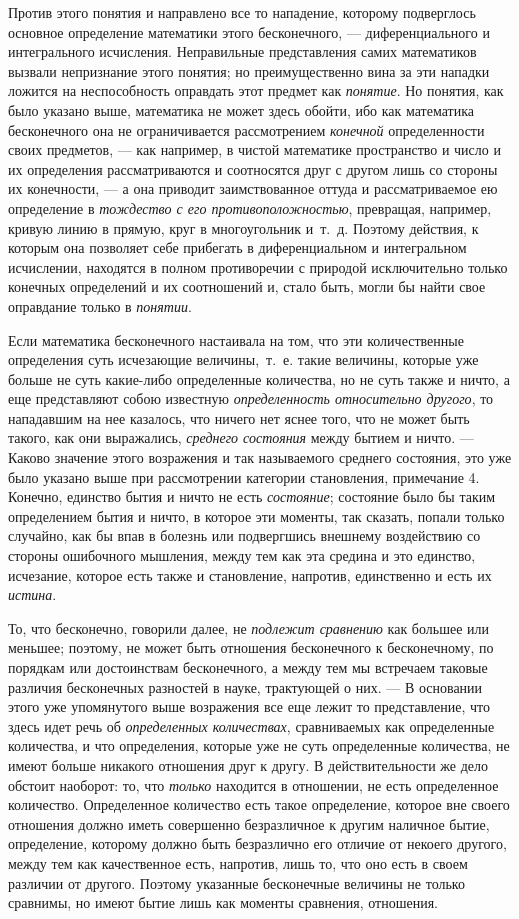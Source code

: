 {Против этого понятия и направлено все то нападение, которому подверглось
основное определение математики этого бесконечного, — диференциального и
интегрального исчисления. Неправильные представления самих математиков
вызвали непризнание этого понятия; но преимущественно вина за эти нападки
ложится на неспособность оправдать этот предмет как
{\em понятие}. Но понятия, как было указано выше,
математика не может здесь обойти, ибо как математика бесконечного она не
ограничивается рассмотрением {\em конечной}
определенности своих предметов, — как например, в чистой математике
пространство и число и их определения рассматриваются и соотносятся друг с
другом лишь со стороны их конечности, — а она приводит заимствованное
оттуда и рассматриваемое ею определение в
{\em тождество с его противоположностью}, превращая,
например, кривую линию в прямую, круг в многоугольник и~т.~д. Поэтому
действия, к которым она позволяет себе прибегать в диференциальном и
интегральном исчислении, находятся в полном противоречии с природой
исключительно только конечных определений и их соотношений и, стало быть,
могли бы найти свое оправдание только в {\em понятии}.

Если математика бесконечного настаивала на том, что эти количественные
определения суть исчезающие величины,~т.~е. такие величины, которые уже
больше не суть какие-либо определенные количества, но не суть также и
ничто, а еще представляют собою известную
{\em определенность относительно другого}, то
нападавшим на нее казалось, что ничего нет яснее того, что не может быть
такого, как они выражались, {\em среднего состояния}
между бытием и ничто. — Каково значение этого возражения и так называемого
среднего состояния, это уже было указано выше при рассмотрении категории
становления, примечание 4. Конечно, единство бытия и ничто не есть
{\em состояние}; состояние было бы таким определением
бытия и ничто, в которое эти моменты, так сказать, попали только случайно,
как бы впав в болезнь или подвергшись внешнему воздействию со стороны
ошибочного мышления, между тем как эта средина и это единство, исчезание,
которое есть также и становление, напротив, единственно и есть их
{\em истина}.

То, что бесконечно, говорили далее, не {\em подлежит
сравнению} как большее или меньшее; поэтому, не может быть отношения
бесконечного к бесконечному, по порядкам или достоинствам бесконечного, а
между тем мы встречаем таковые различия бесконечных разностей в науке,
трактующей о них. — В основании этого уже упомянутого выше возражения все
еще лежит то представление, что здесь идет речь об
{\em определенных количествах}, сравниваемых как
определенные количества, и что определения, которые уже не суть
определенные количества, не имеют больше никакого отношения друг к другу. В
действительности же дело обстоит наоборот: то, что
{\em только} находится в отношении, не есть
определенное количество. Определенное количество есть такое определение,
которое вне своего отношения должно иметь совершенно безразличное к другим
наличное бытие, определение, которому должно быть безразлично его отличие
от некоего другого, между тем как качественное есть, напротив, лишь то, что
оно есть в своем различии от другого. Поэтому указанные бесконечные
величины не только сравнимы, но имеют бытие лишь как моменты сравнения,
отношения.

}
